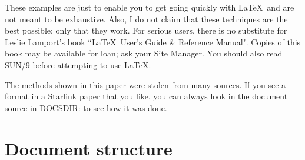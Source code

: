 These examples are just to enable you to get going quickly with \LaTeX\
and are not meant to be exhaustive.
Also, I do not claim that these techniques are the best possible; only that
they work.
For serious users, there is no substitute for Leslie Lamport's book
``\LaTeX\ User's Guide \& Reference Manual".
Copies of this book may be available for loan; ask your Site Manager.
You should also read SUN/9 before attempting to use \LaTeX.

The methods shown in this paper were stolen from many sources.
If you see a format in a Starlink paper that you like, you can always look
in the document source in DOCSDIR: to see how it was done.

\newpage

\section {Document structure}

